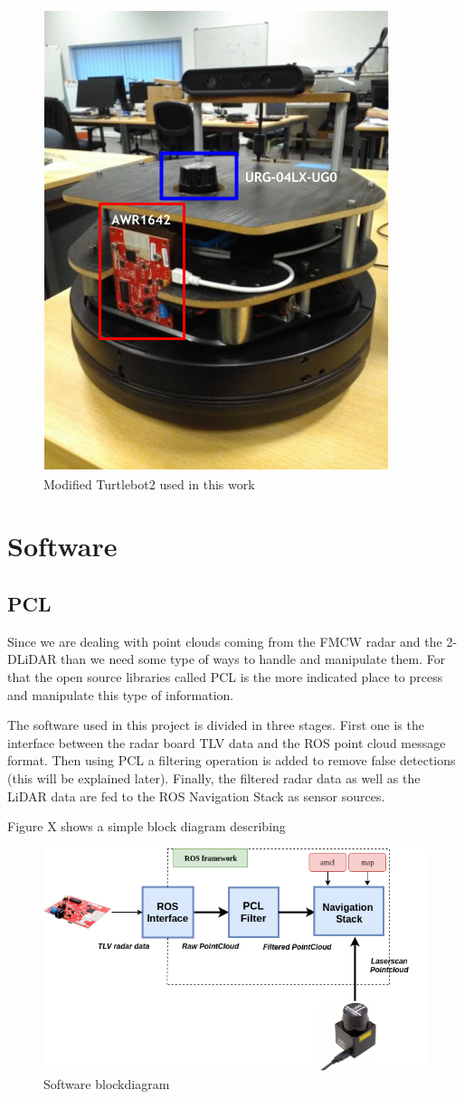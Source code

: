 \begin{figure}[h] 
\centerline{\includegraphics [width=0.5 \textwidth]{imgs/chapter4/turtlebot2.PNG}}
\caption{Modified Turtlebot2 used in this work}
\label{fig::turlebot2M}
\end{figure}


\section{Software}

\subsection{PCL}
Since we are dealing with point clouds coming from the \ac{FMCW} \ac{radar} and the 2-D\ac{LiDAR} than we need some type of ways to handle and manipulate them. For that the open source libraries called \ac{PCL} is the more indicated place to prcess and manipulate this type of information.

The software used in this project is divided in three stages. First one is the interface between the radar board TLV data and the ROS point cloud message format. Then using \ac{PCL} a filtering operation is added to remove false detections (this will be explained later). Finally, the filtered radar data as well as the \ac{LiDAR} data are fed to the ROS Navigation Stack as sensor sources. 

Figure X shows a simple block diagram describing   
\begin{figure}[h] 
\centerline{\includegraphics [width=0.7 \textwidth]{imgs/chapter4/bd.png}}
\caption{Software blockdiagram}
\label{fig::turlebot2}
\end{figure}
